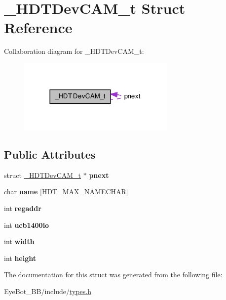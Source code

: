 \hypertarget{struct___h_d_t_dev_c_a_m__t}{\section{\-\_\-\-H\-D\-T\-Dev\-C\-A\-M\-\_\-t \-Struct \-Reference}
\label{struct___h_d_t_dev_c_a_m__t}
}


\-Collaboration diagram for \-\_\-\-H\-D\-T\-Dev\-C\-A\-M\-\_\-t\-:\nopagebreak
\begin{figure}[H]
\begin{center}
\leavevmode
\includegraphics[width=218pt]{struct___h_d_t_dev_c_a_m__t__coll__graph}
\end{center}
\end{figure}
\subsection*{\-Public \-Attributes}
\begin{DoxyCompactItemize}
\item 
\hypertarget{struct___h_d_t_dev_c_a_m__t_a1f31eaf6290ce0dbefa8d419f9e00604}{struct \hyperlink{struct___h_d_t_dev_c_a_m__t}{\-\_\-\-H\-D\-T\-Dev\-C\-A\-M\-\_\-t} $\ast$ {\bfseries pnext}}\label{struct___h_d_t_dev_c_a_m__t_a1f31eaf6290ce0dbefa8d419f9e00604}

\item 
\hypertarget{struct___h_d_t_dev_c_a_m__t_aa78f98b1919db8bfbf14edfefe7ae50c}{char {\bfseries name} \mbox{[}\-H\-D\-T\-\_\-\-M\-A\-X\-\_\-\-N\-A\-M\-E\-C\-H\-A\-R\mbox{]}}\label{struct___h_d_t_dev_c_a_m__t_aa78f98b1919db8bfbf14edfefe7ae50c}

\item 
\hypertarget{struct___h_d_t_dev_c_a_m__t_a0fd3210b7c2d18110cfceb2b6dbe0874}{int {\bfseries regaddr}}\label{struct___h_d_t_dev_c_a_m__t_a0fd3210b7c2d18110cfceb2b6dbe0874}

\item 
\hypertarget{struct___h_d_t_dev_c_a_m__t_a6f986df7f4a82a524c8b048df346ff04}{int {\bfseries ucb1400io}}\label{struct___h_d_t_dev_c_a_m__t_a6f986df7f4a82a524c8b048df346ff04}

\item 
\hypertarget{struct___h_d_t_dev_c_a_m__t_a730c13cb2940ec3cb375213e2ad9b5eb}{int {\bfseries width}}\label{struct___h_d_t_dev_c_a_m__t_a730c13cb2940ec3cb375213e2ad9b5eb}

\item 
\hypertarget{struct___h_d_t_dev_c_a_m__t_a30248dcf486785e64884d407da2fd46d}{int {\bfseries height}}\label{struct___h_d_t_dev_c_a_m__t_a30248dcf486785e64884d407da2fd46d}

\end{DoxyCompactItemize}


\-The documentation for this struct was generated from the following file\-:\begin{DoxyCompactItemize}
\item 
\-Eye\-Bot\-\_\-\-B\-B/include/\hyperlink{types_8h}{types.\-h}\end{DoxyCompactItemize}
